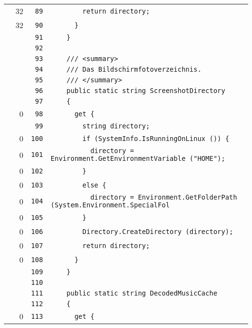 \documentclass[a4paper,10pt]{article}
\begin{document}
\begin{longtable}[l]{lrrl}
\cellcolor{green} & 32 & \verb~89~ & \verb~        return directory;~\\
\cellcolor{green} & 32 & \verb~90~ & \verb~      }~\\
\cellcolor{gray} &  & \verb~91~ & \verb~    }~\\
\cellcolor{gray} &  & \verb~92~ & \verb~~\\
\cellcolor{gray} &  & \verb~93~ & \verb~    /// <summary>~\\
\cellcolor{gray} &  & \verb~94~ & \verb~    /// Das Bildschirmfotoverzeichnis.~\\
\cellcolor{gray} &  & \verb~95~ & \verb~    /// </summary>~\\
\cellcolor{gray} &  & \verb~96~ & \verb~    public static string ScreenshotDirectory~\\
\cellcolor{gray} &  & \verb~97~ & \verb~    {~\\
\cellcolor{red} & 0 & \verb~98~ & \verb~      get {~\\
\cellcolor{gray} &  & \verb~99~ & \verb~        string directory;~\\
\cellcolor{red} & 0 & \verb~100~ & \verb~        if (SystemInfo.IsRunningOnLinux ()) {~\\
\cellcolor{red} & 0 & \verb~101~ & \verb~          directory = Environment.GetEnvironmentVariable ("HOME");~\\
\cellcolor{red} & 0 & \verb~102~ & \verb~        }~\\
\cellcolor{red} & 0 & \verb~103~ & \verb~        else {~\\
\cellcolor{red} & 0 & \verb~104~ & \verb~          directory = Environment.GetFolderPath (System.Environment.SpecialFol~\\
\cellcolor{red} & 0 & \verb~105~ & \verb~        }~\\
\cellcolor{red} & 0 & \verb~106~ & \verb~        Directory.CreateDirectory (directory);~\\
\cellcolor{red} & 0 & \verb~107~ & \verb~        return directory;~\\
\cellcolor{red} & 0 & \verb~108~ & \verb~      }~\\
\cellcolor{gray} &  & \verb~109~ & \verb~    }~\\
\cellcolor{gray} &  & \verb~110~ & \verb~~\\
\cellcolor{gray} &  & \verb~111~ & \verb~    public static string DecodedMusicCache~\\
\cellcolor{gray} &  & \verb~112~ & \verb~    {~\\
\cellcolor{red} & 0 & \verb~113~ & \verb~      get {~\\

\end{longtable}
\end{document}
